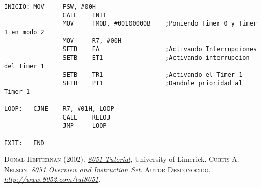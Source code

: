 \documentclass{article}
\begin{document}
\begin{lstlisting}[caption = Codigo Practica 5]
INICIO:	MOV		PSW, #00H		
				CALL 	INIT
				MOV 	TMOD, #00100000B 	;Poniendo Timer 0 y Timer 1 en modo 2
				MOV 	R7, #00H
				SETB 	EA					;Activando Interrupciones
				SETB 	ET1					;Activando interrupcion del Timer 1
				SETB 	TR1					;Activando el Timer 1
				SETB 	PT1					;Dandole prioridad al Timer 1

LOOP: 	CJNE 	R7, #01H, LOOP
				CALL 	RELOJ
				JMP 	LOOP

EXIT:  	END
\end{lstlisting}
\newpage
\begin{thebibliography}{3}
	 \textsc{Donal Heffernan} (2002). \underline{\textit{8051 Tutorial}}, University of Limerick.
	 \textsc{Curtis A. Nelson}. \underline{\textit{8051 Overview and Instruction Set}}.
	 \textsc{Autor Desconocido}. \underline{\textit{http://www.8052.com/tut8051}}.
\end{thebibliography}
	
\end{document}
